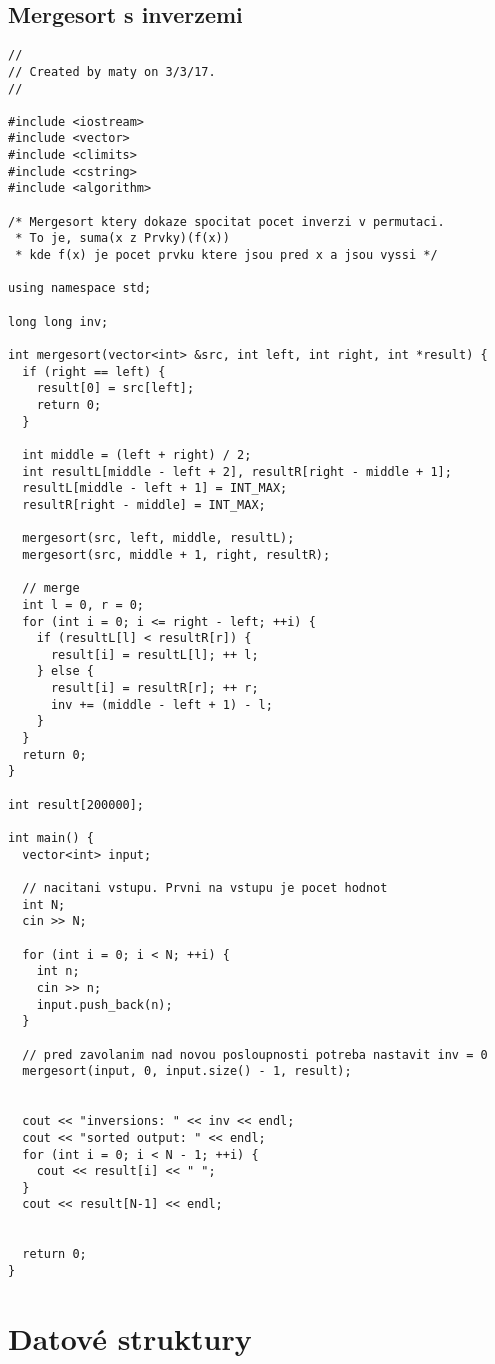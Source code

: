\documentclass{article}
\begin{document}
\subsection{Mergesort s inverzemi}
\begin{lstlisting}
//
// Created by maty on 3/3/17.
//

#include <iostream>
#include <vector>
#include <climits>
#include <cstring>
#include <algorithm>

/* Mergesort ktery dokaze spocitat pocet inverzi v permutaci.
 * To je, suma(x z Prvky)(f(x))
 * kde f(x) je pocet prvku ktere jsou pred x a jsou vyssi */

using namespace std;

long long inv;

int mergesort(vector<int> &src, int left, int right, int *result) {
  if (right == left) {
    result[0] = src[left];
    return 0;
  }

  int middle = (left + right) / 2;
  int resultL[middle - left + 2], resultR[right - middle + 1];
  resultL[middle - left + 1] = INT_MAX;
  resultR[right - middle] = INT_MAX;

  mergesort(src, left, middle, resultL);
  mergesort(src, middle + 1, right, resultR);

  // merge
  int l = 0, r = 0;
  for (int i = 0; i <= right - left; ++i) {
    if (resultL[l] < resultR[r]) {
      result[i] = resultL[l]; ++ l;
    } else {
      result[i] = resultR[r]; ++ r;
      inv += (middle - left + 1) - l;
    }
  }
  return 0;
}

int result[200000];

int main() {
  vector<int> input;

  // nacitani vstupu. Prvni na vstupu je pocet hodnot
  int N;
  cin >> N;

  for (int i = 0; i < N; ++i) {
    int n;
    cin >> n;
    input.push_back(n);
  }

  // pred zavolanim nad novou posloupnosti potreba nastavit inv = 0
  mergesort(input, 0, input.size() - 1, result);


  cout << "inversions: " << inv << endl;
  cout << "sorted output: " << endl;
  for (int i = 0; i < N - 1; ++i) {
    cout << result[i] << " ";
  }
  cout << result[N-1] << endl;


  return 0;
}
\end{lstlisting}


\newpage
\section{Datové struktury}
\end{document}
